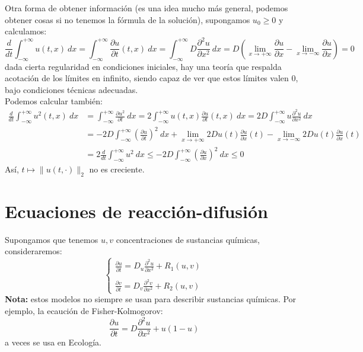 Otra forma de obtener información (es una idea mucho más general, podemos obtener cosas si no tenemos la fórmula de la solución), supongamos $u_0\geq 0$ y calculamos:
\begin{equation*}
    \frac{d}{dt}\int_{-\infty}^{+\infty} u(t,x)~dx = \int_{-\infty}^{+\infty} \frac{\partial u}{\partial t}(t,x)~dx = \int_{-\infty}^{+\infty} D\frac{\partial^2u}{\partial x^2}~dx = D\left(\lim_{x\to+\infty}\frac{\partial u}{\partial x} - \lim_{x\to-\infty} \frac{\partial u}{\partial x} \right)   = 0
\end{equation*}
dada cierta regularidad en condiciones iniciales, hay una teoría que respalda acotación de los límites en infinito, siendo capaz de ver que estos límites valen 0, bajo condiciones técnicas adecuadas.\\

\noindent
Podemos calcular también:
\begin{align*}
    \frac{d}{dt} \int_{-\infty}^{+\infty} u^2(t,x)~dx  &= \int_{-\infty}^{+\infty}\frac{\partial u^2}{\partial t} ~dx = 2\int_{-\infty}^{+\infty} u(t,x)\frac{\partial u}{\partial t}(t,x)~dx  = 2D\int_{-\infty}^{+\infty} u\frac{\partial^2 u}{\partial x^2}~dx  \\
                                                       &= -2D\int_{-\infty}^{+\infty} {\left(\frac{\partial u}{\partial t}\right)}^{2}~dx  + \lim_{x\to+\infty}2Du(t)\frac{\partial u}{\partial x}(t) - \lim_{x\to-\infty} 2Du(t)\frac{\partial u}{\partial x}(t) \\
                                                       &= 2\frac{d}{dt} \int_{-\infty}^{+\infty} u^2~dx  \leq -2D\int_{-\infty}^{+\infty} {\left(\frac{\partial u}{\partial x}\right)}^{2}~dx  \leq 0
\end{align*}
Así, $t\longmapsto \|u(t,\cdot )\|_2$ no es creciente.


\section{Ecuaciones de reacción-difusión}
\noindent
Supongamos que tenemos $u,v$ concentraciones de sustancias químicas, consideraremos:
\begin{equation*}
    \left\{\begin{array}{l}
        \displaystyle \frac{\partial u}{\partial t} = D_u \frac{\partial^2 u}{\partial x^2} + R_1(u,v) \\
        \\
        \displaystyle \frac{\partial v}{\partial t} = D_v \frac{\partial^2 v}{\partial x^2} + R_2(u,v)
    \end{array}\right.
\end{equation*}
\textbf{Nota:} estos modelos no siempre se usan para describir sustancias químicas. Por ejemplo, la ecaución de Fisher-Kolmogorov:
\begin{equation*}
    \frac{\partial u}{\partial t} = D\frac{\partial^2 u}{\partial x^2} + u(1-u)
\end{equation*}
a veces se usa en Ecología.\\

